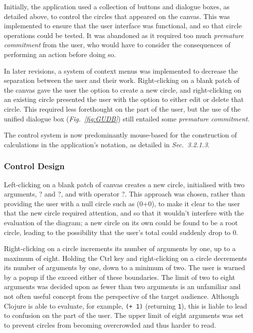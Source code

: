 \documentclass[12pt,twoside,notitlepage,xetex]{report}
\begin{document}
{Initially, the application used a collection of buttons and dialogue boxes, as detailed above, to control the circles that appeared on the canvas.  This was implemented to ensure that the user interface was functional, and so that circle operations could be tested.  It was abandoned as it required too much \emph{premature commitment} from the user, who would have to consider the consequences of performing an action before doing so.

In later revisions, a system of context menus was implemented to decrease the separation between the user and their work.  Right-clicking on a blank patch of the canvas gave the user the option to create a new circle, and right-clicking on an existing circle presented the user with the option to either edit or delete that circle.  This required less forethought on the part of the user, but the use of the unified dialogue box (\emph{Fig.~\ref{fig:GUDB}}) still entailed some \emph{premature commitment}.

The control system is now predominantly mouse-based for the construction of calculations in the application's notation, as detailed in \emph{Sec.~3.2.1.3}.

\subsubsection{Control Design}

Left-clicking on a blank patch of canvas creates a new circle, initialised with two arguments, {\sfapp ?} and {\sfapp ?}, and with operator {\sfapp ?}.  This approach was chosen, rather than providing the user with a null circle such as (0+0), to make it clear to the user that the new circle required attention, and so that it wouldn't interfere with the evaluation of the diagram; a new circle on its own could be found to be a root circle, leading to the possibility that the user's total could suddenly drop to 0.

Right-clicking on a circle increments its number of arguments by one, up to a maximum of eight.  Holding the Ctrl key and right-clicking on a circle decrements its number of arguments by one, down to a minimum of two.  The user is warned by a popup if the exceed either of these boundaries.  The limit of two to eight arguments was decided upon as fewer than two arguments is an unfamiliar and not often useful concept from the perspective of the target audience.  Although Clojure is able to evaluate, for example, \verb¬(+ 1)¬ (returning \verb¬1¬), this is liable to lead to confusion on the part of the user.  The upper limit of eight arguments was set to prevent circles from becoming overcrowded and thus harder to read.

}
\end{document}
